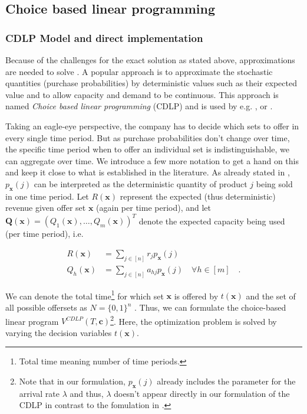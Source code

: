 \subsection{Choice based linear programming}

\subsubsection{CDLP Model and direct implementation}

Because of the challenges for the exact solution as stated above, approximations are needed to solve . A popular approach is to approximate the stochastic quantities (purchase probabilities) by deterministic values such as their expected value and to allow capacity and demand to be continuous. This approach is named \emph{Choice based linear programming} (CDLP) and is used by e.g. \cite{GGallego.}, \cite{Liu.2008} or \cite{Bront.2009}.

Taking an eagle-eye perspective, the company has to decide which sets to offer in every single time period. But as purchase probabilities don't change over time, the specific time period when to offer an individual set is indistinguishable, we can aggregate over time. We introduce a few more notation to get a hand on this and keep it close to what is established in the literature. As already stated in , $p_{\boldsymbol{x}}(j)$ can be interpreted as the deterministic quantity of product $j$ being sold in one time period. Let $R(\mathbf{x})$ represent the expected (thus deterministic) revenue given offer set $\boldsymbol{x}$ (again per time period), and let $\boldsymbol{Q}(\boldsymbol{x}) = (Q_1(\boldsymbol{x}), \dots, Q_m(\boldsymbol{x}))^T$ denote the expected capacity being used (per time period), i.e.

\begin{align}
R(\boldsymbol{x}) &= \sum_{j \in [n]} r_j p_{\boldsymbol{x}}(j)\\
Q_h(\boldsymbol{x}) &= \sum_{j \in [n]} a_{hj} p_{\boldsymbol{x}}(j) \quad \forall h \in [m]\quad.
\end{align}

We can denote the total time\footnote{Total time meaning number of time periods.} for which set $\boldsymbol{x}$ is offered by $t(\boldsymbol{x})$ and the set of all possible offersets as $N = \{0,1\}^n$ . Thus, we can formulate the choice-based linear program $V^{CDLP}(T, \boldsymbol{c})$\footnote{Note that in our formulation, $p_{\boldsymbol{x}}(j)$ already includes the parameter for the arrival rate $\lambda$ and thus, $\lambda$ doesn't appear directly in our formulation of the CDLP in contrast to the fomulation in \cite{Bront.2009}.}. Here, the optimization problem is solved by varying the decision variables $t(\boldsymbol{x})$. 

